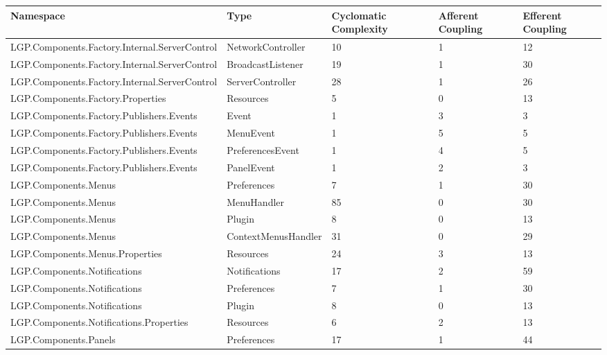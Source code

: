 			\begin{table}[h!t]
				\footnotesize{\begin{tabular}{ | p{82mm} | p{32mm} | p{10mm} | p{10mm} | p{10mm} | }
																						\hline
				Namespace & Type  & Cyclomatic Complexity & Afferent Coupling & Efferent Coupling  \\ \hline					
				LGP.Components.Factory.Internal.ServerControl & NetworkController & 10    & 1     & 12  \\ \hline
				LGP.Components.Factory.Internal.ServerControl & BroadcastListener & 19    & 1     & 30  \\ \hline
				LGP.Components.Factory.Internal.ServerControl & ServerController & 28    & 1     & 26  \\ \hline
				LGP.Components.Factory.Properties & Resources & 5     & 0     & 13  \\ \hline
				LGP.Components.Factory.Publishers.Events & Event & 1     & 3     & 3  \\ \hline
				LGP.Components.Factory.Publishers.Events & MenuEvent & 1     & 5     & 5  \\ \hline
				LGP.Components.Factory.Publishers.Events & PreferencesEvent & 1     & 4     & 5  \\ \hline
				LGP.Components.Factory.Publishers.Events & PanelEvent & 1     & 2     & 3  \\ \hline
				LGP.Components.Menus & Preferences & 7     & 1     & 30  \\ \hline
				LGP.Components.Menus & MenuHandler & \cellcolor{ored}85    & 0     & 30  \\ \hline
				LGP.Components.Menus & Plugin & 8     & 0     & 13  \\ \hline
				LGP.Components.Menus & ContextMenusHandler & 31    & 0     & 29  \\ \hline
				LGP.Components.Menus.Properties & Resources & 24    & 3     & 13  \\ \hline
				LGP.Components.Notifications & Notifications & 17    & 2     & \cellcolor{ored}59  \\ \hline
				LGP.Components.Notifications & Preferences & 7     & 1     & 30  \\ \hline
				LGP.Components.Notifications & Plugin & 8     & 0     & 13  \\ \hline
				LGP.Components.Notifications.Properties & Resources & 6     & 2     & 13  \\ \hline
				LGP.Components.Panels & Preferences & 17    & 1     & \cellcolor{ored}44  \\ \hline

\end{tabular}}
\end{table}
